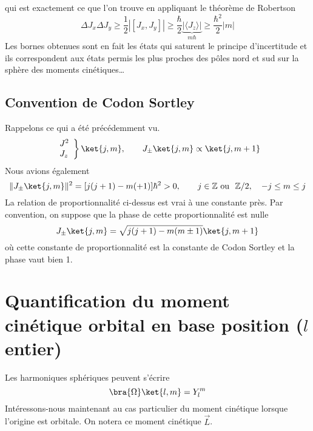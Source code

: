 	qui est exactement ce que l'on trouve en appliquant le théorème de Robertson	
	\begin{equation}
	\Delta J_x\Delta J_y \geq \frac{1}{2}|[J_x,J_y]| \geq \frac{\hbar}{2}\underbrace{|\langle J_z\rangle|}_{m
	\hbar} \geq \frac{\hbar^2}{2}|m|
	\end{equation}
	Les bornes obtenues sont en fait les états qui saturent le principe d'incertitude et ils
	correspondent aux états permis les plus proches des pôles nord et sud sur la sphère des
	moments cinétiques\dots
	
	\subsection{Convention de Codon Sortley}
	Rappelons ce qui a été précédemment vu. 
	\begin{equation}
	\left.\begin{array}{l}
	J^2\\
	J_z
	\end{array}\right\}\ket{j,m},\qquad J_\pm\ket{j,m} \propto \ket{j,m+1}
	\end{equation}
	Nous avions également
	\begin{equation}
	\|J_\pm\ket{j,m}\|^2 = [j(j+1)-m(+1)]\hbar^2 >0,\qquad j\in\mathbb{Z}\ \text{ou }\ \mathbb{Z}/2, 
	\quad -j\leq m \leq j
	\end{equation}
	La relation de proportionnalité ci-dessus est vrai à une constante près. Par convention, 
	on suppose que la phase de cette proportionnalité est nulle
	\begin{equation}
	J_\pm \ket{j,m} = \sqrt{j(j+1)-m(m\pm 1)}\ket{j,m+1}
	\end{equation}
	où cette constante de proportionnalité est la constante de Codon Sortley et la phase vaut bien 
	1.
	


\section{Quantification du moment cinétique orbital en base position ($l$ entier)}
Les harmoniques sphériques peuvent s'écrire
\begin{equation}
\bra{\Omega}\ket{l,m} = Y_l^m
\end{equation}
Intéressons-nous maintenant au cas particulier du moment cinétique lorsque l'origine est orbitale. 
On notera ce moment cinétique $\vec{L}$.\\

